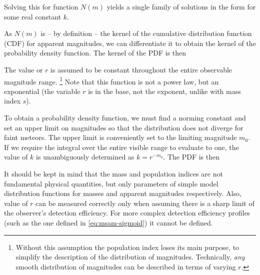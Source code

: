             Solving this for function $N(m)$ yields a single family of solutions
            in the form
            for some real constant $k$.

            As $N(m)$ is -- by definition -- the kernel of the
            cumulative distribution function (CDF) for apparent magnitudes, we can differentiate it
            to obtain the kernel of the probability density function. The kernel of the PDF is then

            The value or $r$ is assumed to be constant throughout the entire observable magnitude range.%
            \footnote{Without this assumption the population index loses its main purpose,
            to simplify the description of the distribution of magnitudes.
            Technically, \emph{any} smooth distribution of magnitudes can be described in terms of varying $r$.}
            Note that this function is not a power law, but an exponential (the variable $r$
            is in the base, not the exponent, unlike with mass index $s$).

            To obtain a probability density function, we must find a norming constant
            and set an upper limit on magnitudes so that the distribution does not diverge for faint meteors.
            The upper limit is conveniently set to the limiting magnitude $m_0$.
            If we require the integral over the entire visible range to evaluate to one,
            the value of $k$ is unambiguously determined as $k = r^{-m_0}$.
            The PDF is then

            It should be kept in mind that the mass and population indices are not fundamental physical quantities,
            but only parameters of simple model distribution functions for masses and apparent magnitudes respectively.
            Also, value of $r$ can be measured correctly only when assuming there is a sharp limit of the observer's detection efficiency.
            For more complex detection efficiency profiles (such as the one defined in \cref{eq:msam-sigmoid})
            it cannot be defined.

